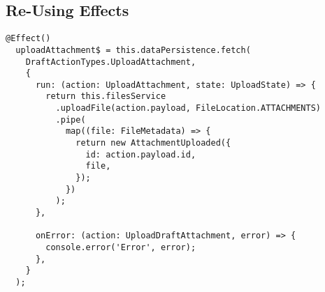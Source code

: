 \subsection{Re-Using Effects}
\begin{lstlisting}
@Effect()
  uploadAttachment$ = this.dataPersistence.fetch(
    DraftActionTypes.UploadAttachment,
    {
      run: (action: UploadAttachment, state: UploadState) => {
        return this.filesService
          .uploadFile(action.payload, FileLocation.ATTACHMENTS)
          .pipe(
            map((file: FileMetadata) => {
              return new AttachmentUploaded({
                id: action.payload.id,
                file,
              });
            })
          );
      },

      onError: (action: UploadDraftAttachment, error) => {
        console.error('Error', error);
      },
    }
  );
\end{lstlisting}

